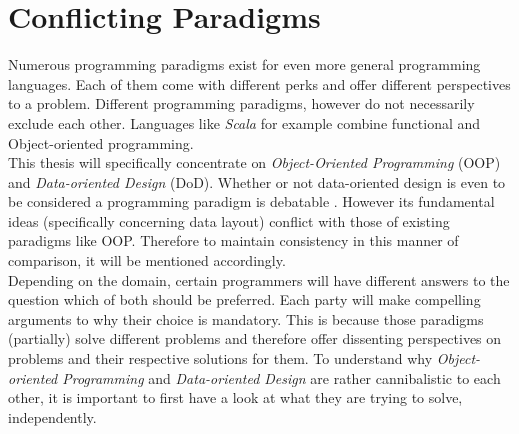 \chapter{Conflicting Paradigms}
Numerous programming paradigms exist for even more general programming languages. Each of them come with different perks and offer different perspectives to a problem. Different programming paradigms, however do not necessarily exclude each other. Languages like \textit{Scala} for example combine functional and Object-oriented programming.\\
This thesis will specifically concentrate on \textit{Object-Oriented Programming} (OOP) and \textit{Data-oriented Design} (DoD). Whether or not data-oriented design is even to be considered a programming paradigm is debatable . However its fundamental ideas (specifically concerning data layout) conflict with those of existing paradigms like OOP. Therefore to maintain consistency in this manner of comparison, it will be mentioned accordingly.\\ 
Depending on the domain, certain programmers will have different answers to the question which of both should be preferred. Each party will make compelling arguments to why their choice is mandatory. This is because those paradigms (partially) solve different problems and therefore offer dissenting perspectives on problems and their respective solutions for them.
To understand why \textit{Object-oriented Programming} and \textit{Data-oriented Design} are rather cannibalistic to each other, it is important to first have a look at what they are trying to solve, independently.

